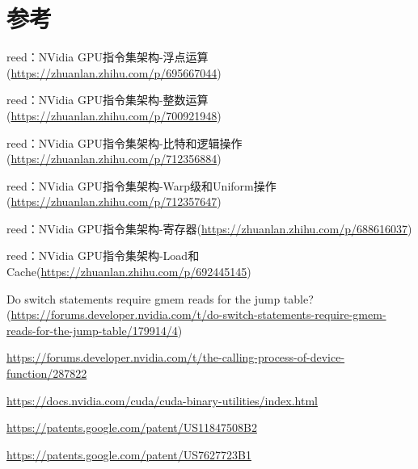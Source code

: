 \section{参考}

reed：NVidia GPU指令集架构-浮点运算(\url{https://zhuanlan.zhihu.com/p/695667044})

reed：NVidia GPU指令集架构-整数运算(\url{https://zhuanlan.zhihu.com/p/700921948})

reed：NVidia GPU指令集架构-比特和逻辑操作(\url{https://zhuanlan.zhihu.com/p/712356884})

reed：NVidia GPU指令集架构-Warp级和Uniform操作(\url{https://zhuanlan.zhihu.com/p/712357647})

reed：NVidia GPU指令集架构-寄存器(\url{https://zhuanlan.zhihu.com/p/688616037})

reed：NVidia GPU指令集架构-Load和Cache(\url{https://zhuanlan.zhihu.com/p/692445145})

Do switch statements require gmem reads for the jump table?(\url{https://forums.developer.nvidia.com/t/do-switch-statements-require-gmem-reads-for-the-jump-table/179914/4})

\url{https://forums.developer.nvidia.com/t/the-calling-process-of-device-function/287822}

\url{https://docs.nvidia.com/cuda/cuda-binary-utilities/index.html}

\url{https://patents.google.com/patent/US11847508B2}

\url{https://patents.google.com/patent/US7627723B1}
